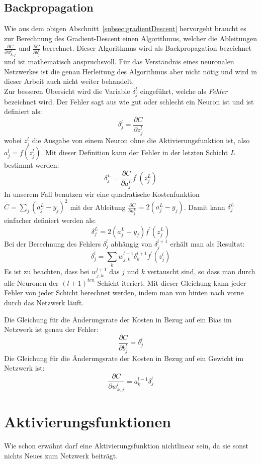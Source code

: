 \documentclass[12pt,a4paper]{report}
\begin{document}
\subsection{Backpropagation}
Wie aus dem obigen Abschnitt~\ref{subsec:gradientDescent} hervorgeht braucht es zur Berechnung des Gradient-Descent einen
Algorithmus, welcher die Ableitungen $\frac{\partial C}{\partial w^l_{k,j}}$ und $\frac{\partial C}{\partial b^l_j}$ berechnet.
Dieser Algorithmus wird als Backpropagation bezeichnet und ist mathematisch anspruchsvoll.
Für das Verständnis eines neuronalen Netzwerkes ist die genau Herleitung des Algorithmus aber nicht nötig und wird in dieser Arbeit auch nicht weiter behandelt.\bigskip\\
Zur besseren Übersicht wird die Variable $\delta^l_j$ eingeführt, welche als \textit{Fehler} bezeichnet wird.
Der Fehler sagt aus wie gut oder schlecht ein Neuron ist und ist definiert als:
\[\delta^l_j = \frac{\partial C}{\partial z^l_j}\]
wobei $z^l_j$ die Ausgabe von einem Neuron ohne die Aktivierungsfunktion ist, also $a^l_j = f(z^l_j)$.
Mit dieser Definition kann der Fehler in der letzten Schicht $L$ bestimmt werden:
\[\delta^L_j = \frac{\partial C}{\partial a^L_j}f^\prime(z^L_j)\]
In unserem Fall benutzen wir eine quadratische Kostenfunktion $C = \sum_{j}(a^L_j - y_j)^2$ mit der
Ableitung $\frac{\partial C}{\partial a^L_j} = 2(a^L_j - y_j)$.
Damit kann $\delta^L_j$ einfacher definiert werden als:
\[\delta^L_j = 2(a^L_j - y_j)f^\prime(z^L_j)\]
Bei der Berechnung des Fehlers $\delta^l_j$ abhängig von $\delta^{l+1}_j$ erhält man als Resultat:
\[\delta^l_j = \sum_k w^{l+1}_{j,k}\delta^{l+1}_k f^\prime(z^l_j)\]
Es ist zu beachten, dass bei $w^{l+1}_{j,k}$ das $j$ und $k$ vertauscht sind, so dass man durch alle Neuronen der $(l+1)^{ten}$ Schicht iteriert.
Mit dieser Gleichung kann jeder Fehler von jeder Schicht berechnet werden, indem man von hinten nach vorne durch das Netzwerk läuft.

Die Gleichung für die Änderungsrate der Kosten in Bezug auf ein Bias im Netzwerk ist genau der Fehler:
\[\frac{\partial C}{\partial b^l_j} = \delta^l_j\]
Die Gleichung für die Änderungsrate der Kosten in Bezug auf ein Gewicht im Netzwerk ist:
\[\frac{\partial C}{\partial w^{l}_{k,j}} = a^{l-1}_k\delta^l_j\]

\section{Aktivierungsfunktionen}\label{sec:aktivierungsfunktionen}
Wie schon erwähnt darf eine Aktivierungsfunktion nichtlinear sein, da sie sonst nichts Neues zum Netzwerk beiträgt.
\end{document}
